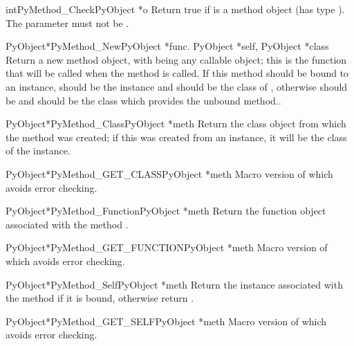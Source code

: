 \begin{cfuncdesc}{int}{PyMethod_Check}{PyObject *o}
  Return true if  is a method object (has type
  ).  The parameter must not be \NULL{}.
\end{cfuncdesc}

\begin{cfuncdesc}{PyObject*}{PyMethod_New}{PyObject *func.
                                           PyObject *self, PyObject *class}
  Return a new method object, with  being any callable
  object; this is the function that will be called when the method is
  called.  If this method should be bound to an instance, 
  should be the instance and  should be the class of
  , otherwise  should be \NULL{} and 
  should be the class which provides the unbound method..
\end{cfuncdesc}

\begin{cfuncdesc}{PyObject*}{PyMethod_Class}{PyObject *meth}
  Return the class object from which the method  was
  created; if this was created from an instance, it will be the class
  of the instance.
\end{cfuncdesc}

\begin{cfuncdesc}{PyObject*}{PyMethod_GET_CLASS}{PyObject *meth}
  Macro version of  which avoids error
  checking.
\end{cfuncdesc}

\begin{cfuncdesc}{PyObject*}{PyMethod_Function}{PyObject *meth}
  Return the function object associated with the method .
\end{cfuncdesc}

\begin{cfuncdesc}{PyObject*}{PyMethod_GET_FUNCTION}{PyObject *meth}
  Macro version of  which avoids error
  checking.
\end{cfuncdesc}

\begin{cfuncdesc}{PyObject*}{PyMethod_Self}{PyObject *meth}
  Return the instance associated with the method  if it is
  bound, otherwise return \NULL{}.
\end{cfuncdesc}

\begin{cfuncdesc}{PyObject*}{PyMethod_GET_SELF}{PyObject *meth}
  Macro version of  which avoids error
  checking.
\end{cfuncdesc}


